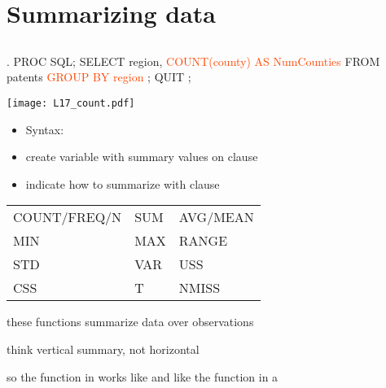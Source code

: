 \section[Summarizing data]{Summarizing data}
\subsection{}
\begin{frame}
\end{frame}

\begin{frame}[fragile]
\begin{code}{.}
PROC SQL;
   SELECT region,
          \textcolor{OrangeRed}{COUNT(county) AS NumCounties}
   FROM patents
   \textcolor{OrangeRed}{GROUP BY region}
   ;
QUIT ;
\end{code}
\emp
\blankcolumn
{}
\texttt{[image: L17\_count.pdf]}
\emp

\vskip5pt
\begin{itemize}
\item Syntax: 
\item create variable with summary values on  clause
\item indicate how to summarize with  clause
\end{itemize}
\end{frame}

\begin{frame}
\begin{tabular}{p{4cm} p{3cm} p{3cm}}
COUNT/FREQ/N & SUM & AVG/MEAN \\
MIN & MAX & RANGE \\
STD & VAR & USS \\
CSS & T & NMISS\\
\end{tabular}
\bi
\item[]
\item these functions summarize data over observations
\item think vertical summary, not horizontal
\item so the  function in  works like  and  like the  function in a 
\ei
\end{frame}


